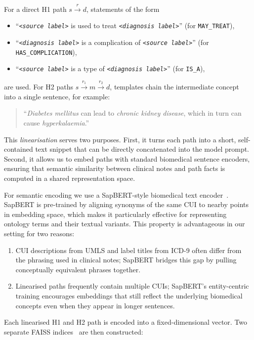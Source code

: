 For a direct H1 path $s \xrightarrow{r} d$, statements of the form
\begin{itemize}
    \item ``\emph{\texttt{<source label>}} is used to treat \emph{\texttt{<diagnosis label>}}'' (for \texttt{MAY\_TREAT}),
    \item ``\emph{\texttt{<diagnosis label>}} is a complication of \emph{\texttt{<source label>}}'' (for \texttt{HAS\_COMPLICATION}),
    \item ``\emph{\texttt{<source label>}} is a type of \emph{\texttt{<diagnosis label>}}'' (for \texttt{IS\_A}),
\end{itemize}
are used. For H2 paths $s \xrightarrow{r_1} m \xrightarrow{r_2} d$, templates chain the intermediate concept into a single sentence, for example:
\begin{quote}
    ``\emph{Diabetes mellitus} can lead to \emph{chronic kidney disease}, which in turn can cause \emph{hyperkalaemia}.'' 
\end{quote}

This \emph{linearisation} serves two purposes. First, it turns each path into a short, self-contained text snippet that can be directly concatenated into the model prompt. Second, it allows us to embed paths with standard biomedical sentence encoders, ensuring that semantic similarity between clinical notes and path facts is computed in a shared representation space.

For semantic encoding we use a SapBERT-style biomedical text encoder~\cite{liu2020self}. SapBERT is pre-trained by aligning synonyms of the same CUI to nearby points in embedding space, which makes it particularly effective for representing ontology terms and their textual variants. This property is advantageous in our setting for two reasons:

\begin{enumerate}
    \item CUI descriptions from UMLS and label titles from ICD-9 often differ from the phrasing used in clinical notes; SapBERT bridges this gap by pulling conceptually equivalent phrases together.
    \item Linearised paths frequently contain multiple CUIs; SapBERT's entity-centric training encourages embeddings that still reflect the underlying biomedical concepts even when they appear in longer sentences.
\end{enumerate}

Each linearised H1 and H2 path is encoded into a fixed-dimensional vector. Two separate FAISS indices~\cite{johnson2019billion} are then constructed:

